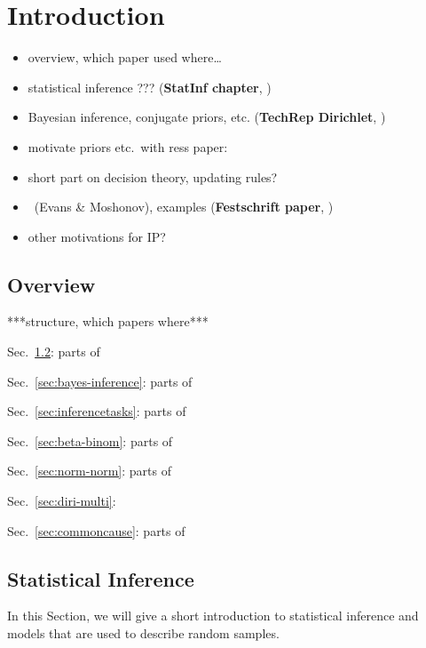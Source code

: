\chapter{Introduction}


\begin{itemize}
\item overview, which paper used where\ldots
\item statistical inference ??? (\textbf{StatInf chapter}, \cite{itip-statinf})
\item Bayesian inference, conjugate priors, etc. (\textbf{TechRep Dirichlet}, \cite{Walter2012b})
\item motivate priors etc.\ with ress paper: \cite{Walter2013a}
\item short part on decision theory, updating rules?
\item \pdc\ (Evans \& Moshonov), examples (\textbf{Festschrift paper}, \cite{Walter2010a})
\item other motivations for IP?
\end{itemize}

\section{Overview}

***structure, which papers where***

Sec.~\ref{sec:stat-inference}: parts of \cite{itip-statinf}

Sec.~\ref{sec:bayes-inference}: parts of \cite{itip-statinf}

Sec.~\ref{sec:inferencetasks}: parts of \cite{itip-statinf}

Sec.~\ref{sec:beta-binom}: parts of \cite{itip-statinf}

Sec.~\ref{sec:norm-norm}: parts of \cite{itip-statinf}

Sec.~\ref{sec:diri-multi}: \cite{Walter2012b}

Sec.~\ref{sec:commoncause}: parts of \cite{Walter2013a}


\section{Statistical Inference}
\label{sec:stat-inference}


In this Section, we will give a short introduction to statistical inference
and models that are used to describe random samples.

